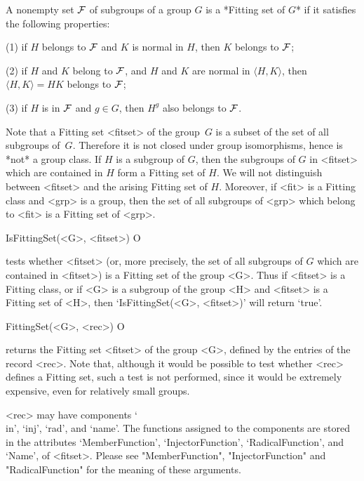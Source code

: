\null


A nonempty set $\cal F$ of subgroups of a group $G$ is a *Fitting set of
$G$*  if it satisfies the following properties:

\beginlist
\item{(1)} if $H$ belongs to $\cal F$ and $K$ is normal in $H$, then $K$ 
           belongs to $\cal F$;
         
\item{(2)} if $H$ and $K$ belong to $\cal F$, and $H$ and $K$ are normal in
$\langle H, K \rangle$, then $\langle H, K \rangle = H K$ belongs to $\cal
F$;
         
\item{(3)} if $H$ is in $\cal F$ and $g \in G$, then $H^g$ also belongs to 
           $\cal F$.
\endlist

Note that a Fitting set <fitset> of the group~$G$ is a subset of the set of all
subgroups of~$G$. Therefore it is not closed under group
isomorphisms, hence  is *not* a group class. If $H$ is a subgroup of $G$, then the
subgroups of $G$ in <fitset> which are contained in $H$ form a Fitting set of $H$.
We will not distinguish between <fitset> and the arising Fitting set of $H$. 
Moreover, if  <fit> is a Fitting class and <grp> is a group, then the set of all
subgroups of <grp> which belong to <fit> is a Fitting set of <grp>.

\>IsFittingSet(<G>, <fitset>) O

tests whether <fitset> (or, more precisely, the set of all subgroups of $G$
which are contained in  <fitset>) is a Fitting set of the group <G>. Thus if
<fitset> is a Fitting class, or if
<G> is a subgroup of the group <H> and <fitset> is a Fitting set of <H>,
then `IsFittingSet(<G>, <fitset>)' will return `true'.

\>FittingSet(<G>, <rec>) O

returns the Fitting set <fitset> of the group <G>, defined by the entries of the
record <rec>. Note that, although it would be possible to test whether <rec> 
defines a Fitting set, such a test
is not performed, since it would be extremely expensive, even for relatively
small groups.

<rec> may have components `\\in', `inj', `rad', and `name'. The
functions assigned to the components are stored in the attributes
`MemberFunction', `InjectorFunction', 
`RadicalFunction', and `Name', of <fitset>. Please see "MemberFunction",
"InjectorFunction" and "RadicalFunction" for the meaning of these arguments.

